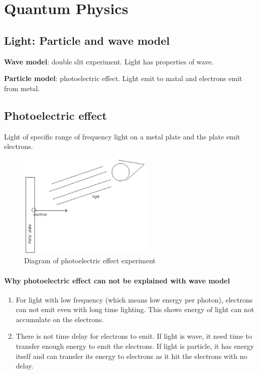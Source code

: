 \section{Quantum Physics}
    \subsection{Light: Particle and wave model}
        \textbf{Wave model}: double slit experiment. Light has properties of wave.

        \textbf{Particle model}: photoelectric effect. Light emit to matal and electrons emit from metal. 
    
    \subsection{Photoelectric effect}
        Light of specific range of frequency light on a metal plate and the plate emit electrons.

        \begin{figure}[H]
            \begin{center}
                \includegraphics[height=5cm]{quantum_charts/photo_ele_show.eps}
            \end{center}
            \caption{Diagram of photoelectric effect experiment}
            \label{pe_exp_dia}
        \end{figure}

        \paragraph{Why photoelectric effect can not be explained with wave model}
            \begin{enumerate}
                \item For light with low frequency (which means low energy per photon), electrons can not emit even with long time lighting.
                        This shows energy of light can not accumulate on the electrons. 
                \item There is not time delay for electrons to emit.
                        If light is wave, it need time to transfer enough energy to emit the electrons. If light is particle, it has energy itself and can transfer its energy to electrons as it hit the electrons with no delay.
            \end{enumerate}
        
